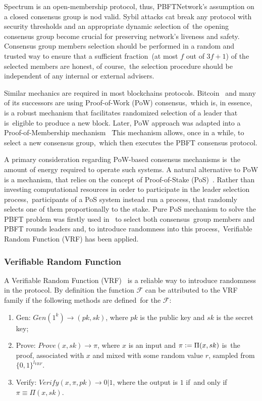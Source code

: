 Spectrum is an open-membership protocol, thus, PBFTNetwork's assumption on a closed consensus group is nod valid.
Sybil attacks cat break any protocol with security thresholds and an appropriate dynamic selection of\
the opening consensus group become crucial for preserving network's liveness and safety.
Consensus group members selection should be performed in a random and trusted way to ensure that a sufficient fraction\
(at most $f$ out of ${3 f + 1}$) of the selected members are honest, of course,\
the selection procedure should be independent of any internal or external advisers.

Similar mechanics are required in most blockchains protocols.
Bitcoin~\cite{nakamoto2009bitcoin} and many of its successors are using Proof-of-Work (PoW) consensus,\
which is, in essence, is a robust mechanism that facilitates randomized selection of a leader that is\
eligible to produce a new block.
Later, PoW approach was adapted into a Proof-of-Membership mechanism ~\cite{kokoriskogias2016enhancing}\.
This mechanism allows, once in a while, to select a new consensus group,\
which then executes the PBFT consensus protocol.

A primary consideration regarding PoW-based consensus mechanisms is\
the amount of energy required to operate such systems.
A natural alternative to PoW is a mechanism, that relies on the concept of Proof-of-Stake (PoS)~\cite{King2012PPCoinPC}.
Rather than investing computational resources in order to participate in the leader selection process,\
participants of a PoS system instead run a process, that randomly selects one of them proportionally to the stake.
Pure PoS mechanism to solve the PBFT problem was firstly used in~\cite{cryptoeprint:2017/454} to select both consensus\
group members and PBFT rounds leaders and, to introduce randomness into this process,\
Verifiable Random Function (VRF) has been applied.

\subsubsection{Verifiable Random Function}

A Verifiable Random Function (VRF)~\cite{Micali1999} is a reliable way to introduce randomness in the protocol.
By definition the function $\mathcal{F}$ can be attributed to the VRF family if the following methods are defined\
for the $\mathcal{F}$:
\begin{enumerate}
    \item Gen: ${Gen(1^k) \rightarrow (pk, sk)}$, where $pk$ is the public key and $sk$ is the secret key;
    \item Prove: ${Prove(x, sk) \rightarrow \pi}$, where $x$ is an input and $\pi \vcentcolon= \Pi(x, sk)$ is\
    the proof, associated with $x$ and mixed with some random value $r$, sampled from $\{0,1\}^{l_{VRF}}$.
    \item Verify: ${Verify(x, \pi, pk) \rightarrow 0 | 1}$, where the output is $1$ if\
    and only if ${\pi \equiv \Pi(x, sk)}$.
\end{enumerate}

